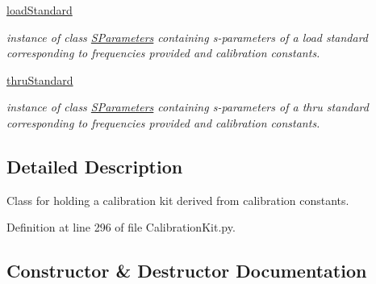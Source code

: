 \begin{DoxyCompactItemize}
\hyperlink{classSignalIntegrity_1_1Measurement_1_1CalKit_1_1CalibrationKit_1_1CalibrationKit_af4b585ef48fed700d70b2bee7e5ffdbe}{load\+Standard}
\begin{DoxyCompactList}\small\item\em instance of class \hyperlink{namespaceSignalIntegrity_1_1SParameters}{S\+Parameters} containing s-\/parameters of a load standard corresponding to frequencies provided and calibration constants. \end{DoxyCompactList}\item 
\hyperlink{classSignalIntegrity_1_1Measurement_1_1CalKit_1_1CalibrationKit_1_1CalibrationKit_a63691e31dc0a91dbcfe40635f9c87599}{thru\+Standard}
\begin{DoxyCompactList}\small\item\em instance of class \hyperlink{namespaceSignalIntegrity_1_1SParameters}{S\+Parameters} containing s-\/parameters of a thru standard corresponding to frequencies provided and calibration constants. \end{DoxyCompactList}\end{DoxyCompactItemize}


\subsection{Detailed Description}
Class for holding a calibration kit derived from calibration constants. 

Definition at line 296 of file Calibration\+Kit.\+py.



\subsection{Constructor \& Destructor Documentation}
\mbox{\label{classSignalIntegrity_1_1Measurement_1_1CalKit_1_1CalibrationKit_1_1CalibrationKit_a7c969c556643c62769436aaee9bee342}} 
